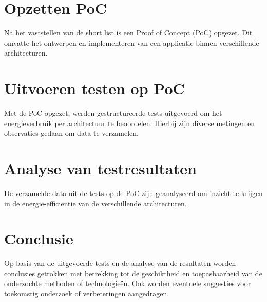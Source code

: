 \section{Opzetten PoC}
Na het vaststellen van de short list is een Proof of Concept (PoC) opgezet. Dit omvatte het ontwerpen en implementeren van een applicatie binnen verschillende architecturen.


\section{Uitvoeren testen op PoC}
Met de PoC opgezet, werden gestructureerde tests uitgevoerd om het energieverbruik per architectuur te beoordelen. Hierbij zijn diverse metingen en observaties gedaan om data te verzamelen.


\section{Analyse van testresultaten}
De verzamelde data uit de tests op de PoC zijn geanalyseerd om inzicht te krijgen in de energie-efficiëntie van de verschillende architecturen. 

\section{Conclusie}
Op basis van de uitgevoerde tests en de analyse van de resultaten worden conclusies getrokken met betrekking tot de geschiktheid en toepasbaarheid van de onderzochte methoden of technologieën. Ook worden eventuele suggesties voor toekomstig onderzoek of verbeteringen aangedragen.
